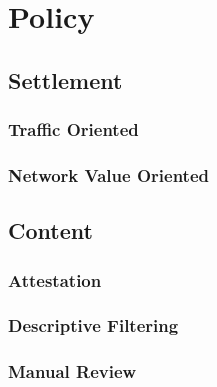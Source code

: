 \section{Policy}

\subsection{Settlement}

\subsubsection{Traffic Oriented}

\subsubsection{Network Value Oriented}

\subsection{Content}

\subsubsection{Attestation}

\subsubsection{Descriptive Filtering}

\subsubsection{Manual Review}
